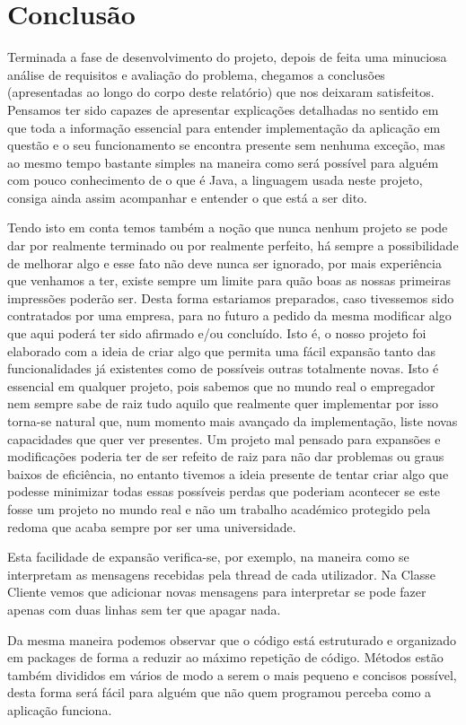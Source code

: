 
\chapter*{Conclusão}

Terminada a fase de desenvolvimento do projeto, depois de feita uma minuciosa análise de requisitos e avaliação do problema, chegamos a conclusões (apresentadas ao longo do corpo deste relatório) que nos deixaram satisfeitos. Pensamos ter sido capazes de apresentar explicações detalhadas no sentido em que toda a informação essencial para entender implementação da aplicação em questão e o seu funcionamento se encontra presente sem nenhuma exceção, mas ao mesmo tempo bastante simples na maneira como será possível para alguém com pouco conhecimento de o que é Java, a linguagem usada neste projeto, consiga ainda assim acompanhar e entender o que está a ser dito.

Tendo isto em conta temos também a noção que nunca nenhum projeto se pode dar por realmente terminado ou por realmente perfeito, há sempre a possibilidade de melhorar algo e esse fato não deve nunca ser ignorado, por mais experiência que venhamos a ter, existe sempre um limite para quão boas as nossas primeiras impressões poderão ser. Desta forma estariamos preparados, caso tivessemos sido contratados por uma empresa, para no futuro a pedido da mesma modificar algo que aqui poderá ter sido afirmado e/ou concluído. Isto é, o nosso projeto foi elaborado com a ideia de criar algo que permita uma fácil expansão tanto das funcionalidades já existentes como de possíveis outras totalmente novas. Isto é essencial em qualquer projeto, pois sabemos que no mundo real o empregador nem sempre sabe de raiz tudo aquilo que realmente quer implementar por isso torna-se natural que, num momento mais avançado da implementação, liste novas capacidades que quer ver presentes. Um projeto mal pensado para expansões e modificações poderia ter de ser refeito de raiz para não dar problemas ou graus baixos de eficiência, no entanto tivemos a ideia presente de tentar criar algo que podesse minimizar todas essas possíveis perdas que poderiam acontecer se este fosse um projeto no mundo real e não um trabalho académico protegido pela redoma que acaba sempre por ser uma universidade.

Esta facilidade de expansão verifica-se, por exemplo, na maneira como se interpretam as mensagens recebidas pela thread de cada utilizador. Na Classe Cliente vemos que adicionar novas mensagens para interpretar se pode fazer apenas com duas linhas sem ter que apagar nada.

Da mesma maneira podemos observar que o código está estruturado e organizado em packages de forma a reduzir ao máximo repetição de código. Métodos estão também divididos em vários de modo a serem o mais pequeno e concisos possível, desta forma será fácil para alguém que não quem programou perceba como a aplicação funciona.   






